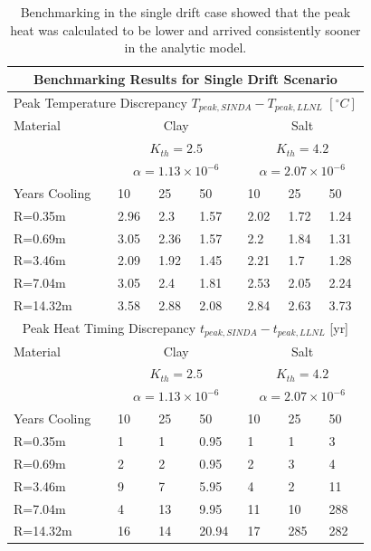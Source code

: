 \documentclass{anstrans}
\begin{document}
\begin{table}
  \centering
  \footnotesize{
  \begin{tabular}{|l|l|l|l|l|l|l|}
    \multicolumn{7}{c}{\textbf{Benchmarking Results for Single Drift Scenario}}\\
    \hline
    \multicolumn{7}{|c|}{Peak Temperature Discrepancy $T_{peak,SINDA}-T_{peak,LLNL}$ $[^{\circ}C]$} \\
    \hline
    Material & \multicolumn{3}{|c|}{Clay} 
    & \multicolumn{3}{|c|}{Salt}\\ 
    & \multicolumn{3}{|c|}{$K_{th}=2.5$} 
    & \multicolumn{3}{|c|}{$K_{th}=4.2$}\\ 
    & \multicolumn{3}{|c|}{$\alpha=1.13\times10^{-6}$} 
    & \multicolumn{3}{|c|}{$\alpha=2.07\times10^{-6}$}\\ 
    \hline
    Years Cooling  & 10     & 25      & 50      & 10     & 25     & 50\\
    \hline
     R=0.35m  & 2.96   & 2.3     & 1.57    & 2.02   & 1.72   & 1.24\\
     R=0.69m  & 3.05   & 2.36    & 1.57    & 2.2    & 1.84   & 1.31\\
     R=3.46m  & 2.09   & 1.92    & 1.45    & 2.21   & 1.7    & 1.28\\
     R=7.04m  & 3.05   & 2.4     & 1.81    & 2.53   & 2.05   & 2.24\\
     R=14.32m & 3.58   & 2.88    & 2.08    & 2.84   & 2.63   & 3.73\\
    \hline
    \multicolumn{7}{|c|}{Peak Heat Timing Discrepancy $t_{peak,SINDA}-t_{peak,LLNL}$ [yr]} \\
    \hline
    Material & \multicolumn{3}{|c|}{Clay} 
    & \multicolumn{3}{|c|}{Salt}\\ 
    & \multicolumn{3}{|c|}{$K_{th}=2.5$} 
    & \multicolumn{3}{|c|}{$K_{th}=4.2$}\\ 
    & \multicolumn{3}{|c|}{$\alpha=1.13\times10^{-6}$} 
    & \multicolumn{3}{|c|}{$\alpha=2.07\times10^{-6}$}\\ 
    \hline
    Years Cooling  & 10     & 25      & 50      & 10     & 25     & 50\\
    \hline
     R=0.35m  & 1    & 1       &  0.95   & 1      & 1      & 3\\
     R=0.69m  & 2    & 2       & 0.95    & 2      & 3      & 4\\
     R=3.46m  & 9    & 7       & 5.95    & 4      & 2      & 11\\
     R=7.04m  & 4    & 13      & 9.95    & 11     & 10     & 288\\
     R=14.32m & 16   & 14      & 20.94   & 17     & 285    & 282\\
    \hline
  \end{tabular}
  \caption{Benchmarking in the single drift case showed that the peak heat 
  was calculated to be lower and arrived consistently sooner in the analytic 
  model. }
  \label{tab:bench}
  }
\end{table}
\end{document}
